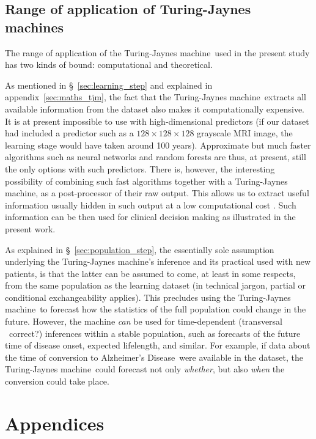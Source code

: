 \documentclass[utf8]{FrontiersinHarvard} %
\newcommand*{\puzzle}{{\fontencoding{U}\fontfamily{fontawesometwo}\selectfont\symbol{225}}}
\newcommand{\mynotez}[1]{{\color{notecolour}\puzzle\ #1}}
\newcommand*{\sect}{\S}%
\renewcommand*{\|}[1][]{\nonscript\:#1\vert\nonscript\:\mathopen{}}
\newcommand*{\ad}{Alzheimer's Disease}
\newcommand*{\tjm}{Turing-Jaynes machine}
\begin{document}
\subsection{Range of application of \tjm s}
\label{sec:rangeTJM}

The range of application of the \tjm\ used in the present study has two kinds of bound: computational and theoretical.

As mentioned in \sect~\ref{sec:learning_step} and explained in appendix~\ref{sec:maths_tjm}, the fact that the \tjm\ extracts all available information from the dataset also makes it computationally expensive. It is at present impossible to use with high-dimensional predictors (if our dataset had included a predictor such as a $128\times128\times128$ grayscale MRI image, the learning stage would have taken around 100 years). Approximate but much faster algorithms such as neural networks and random forests are thus, at present, still the only options with such predictors. There is, however, the interesting possibility of combining such fast algorithms together with a \tjm, as a post-processor of their raw output. This allows us to extract useful information usually hidden in such output at a low computational cost \citep{dyrlandetal2022b}. Such information can be then used for clinical decision making as illustrated in the present work.

As explained in \sect~\ref{sec:population_step}, the essentially sole assumption underlying the \tjm's inference and its practical used with new patients, is that the latter can be assumed to come, at least in some respects, from the same population as the learning dataset (in technical jargon, partial or conditional exchangeability applies). This precludes using the \tjm\ to forecast how the statistics of the full population could change in the future. However, the machine \emph{can} be used for time-dependent (transversal \mynotez{correct?}) inferences within a stable population, such as forecasts of the future time of disease onset, expected lifelength, and similar. For example, if data about the time of conversion to \ad\ were available in the dataset, the \tjm\ could forecast not only \emph{whether}, but also \emph{when} the conversion could take place.

\appendix
\renewcommand\thesection{\Alph{section}}
\section{Appendices}
\label{sec:appendices}
\end{document}
